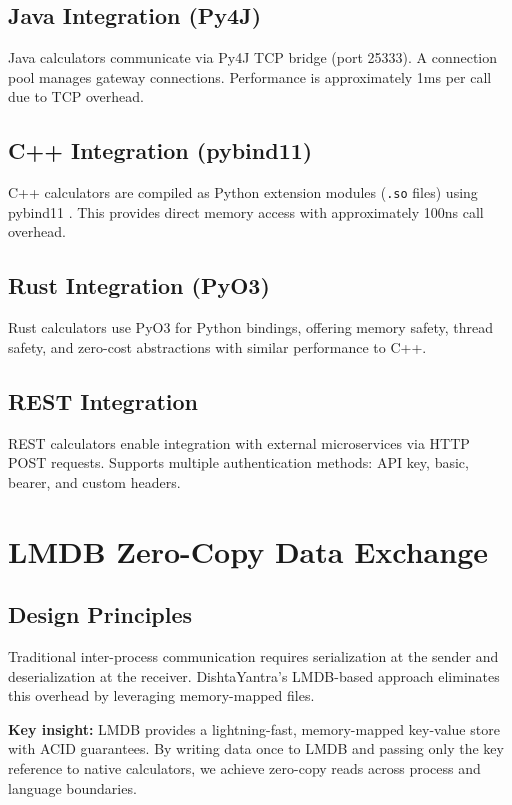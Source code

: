 \documentclass[11pt,a4paper]{article}
\begin{document}
\subsection{Java Integration (Py4J)}

Java calculators communicate via Py4J TCP bridge (port 25333). A connection pool manages gateway connections. Performance is approximately 1ms per call due to TCP overhead.

\subsection{C++ Integration (pybind11)}

C++ calculators are compiled as Python extension modules (\texttt{.so} files) using pybind11 \cite{pybind11}. This provides direct memory access with approximately 100ns call overhead.

\subsection{Rust Integration (PyO3)}

Rust calculators use PyO3 \cite{pyo3} for Python bindings, offering memory safety, thread safety, and zero-cost abstractions with similar performance to C++.

\subsection{REST Integration}

REST calculators enable integration with external microservices via HTTP POST requests. Supports multiple authentication methods: API key, basic, bearer, and custom headers.

\section{LMDB Zero-Copy Data Exchange}

\subsection{Design Principles}

Traditional inter-process communication requires serialization at the sender and deserialization at the receiver. DishtaYantra's LMDB-based approach eliminates this overhead by leveraging memory-mapped files.

\textbf{Key insight:} LMDB \cite{chu2011lmdb} provides a lightning-fast, memory-mapped key-value store with ACID guarantees. By writing data once to LMDB and passing only the key reference to native calculators, we achieve zero-copy reads across process and language boundaries.
\end{document}
